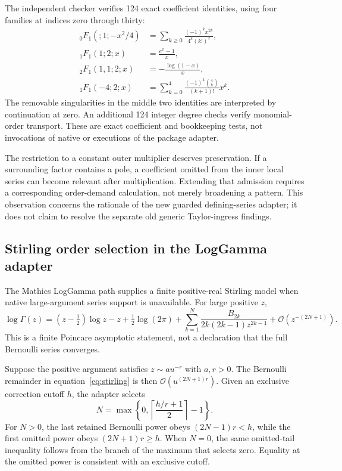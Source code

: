 \documentclass[11pt,letterpaper]{article}
\newcommand{\code}[1]{\texttt{\detokenize{#1}}}
\newcommand{\OO}{\mathcal O}
\begin{document}
The independent checker verifies 124 exact coefficient identities, using four families at indices zero through thirty:
\begin{align*}
 {}_0F_1(;1;-x^2/4)&=\sum_{k\geq0}\frac{(-1)^kx^{2k}}{4^k(k!)^2},\\
 {}_1F_1(1;2;x)&=\frac{e^x-1}{x},\\
 {}_2F_1(1,1;2;x)&=-\frac{\log(1-x)}x,\\
 {}_1F_1(-4;2;x)&=\sum_{k=0}^{4}
 \frac{(-1)^k\binom4k}{(k+1)!}x^k.
\end{align*}
The removable singularities in the middle two identities are interpreted by continuation at zero. An additional 124 integer degree checks verify monomial-order transport. These are exact coefficient and bookkeeping tests, not invocations of native \code{Series} or executions of the package adapter.

The restriction to a constant outer multiplier deserves preservation. If a surrounding factor contains a pole, a coefficient omitted from the inner local series can become relevant after multiplication. Extending that admission requires a corresponding order-demand calculation, not merely broadening a pattern. This observation concerns the rationale of the new guarded defining-series adapter; it does not claim to resolve the separate old generic Taylor-ingress findings.

\subsection{Stirling order selection in the LogGamma adapter}

The Mathics LogGamma path supplies a finite positive-real Stirling model when native large-argument series support is unavailable. For large positive $z$,
\begin{equation}
 \log\Gamma(z)=\left(z-\tfrac12\right)\log z-z+\tfrac12\log(2\pi)
 +\sum_{k=1}^{N}\frac{B_{2k}}{2k(2k-1)z^{2k-1}}
 +\OO(z^{-(2N+1)}).
 \label{eq:stirling}
\end{equation}
This is a finite Poincare asymptotic statement, not a declaration that the full Bernoulli series converges.~\cite{mspecial,dlmf5}

Suppose the positive argument satisfies $z\sim a u^{-r}$ with $a,r>0$. The Bernoulli remainder in equation~\eqref{eq:stirling} is then $\OO(u^{(2N+1)r})$. Given an exclusive correction cutoff $h$, the adapter selects
\[
 N=\max\left\{0,\left\lceil\frac{h/r+1}{2}\right\rceil-1\right\}.
\]
For $N>0$, the last retained Bernoulli power obeys $(2N-1)r<h$, while the first omitted power obeys $(2N+1)r\geq h$. When $N=0$, the same omitted-tail inequality follows from the branch of the maximum that selects zero. Equality at the omitted power is consistent with an exclusive cutoff.
\end{document}
